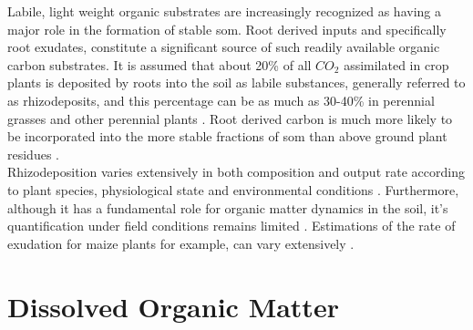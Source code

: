 	Labile, light weight organic substrates are increasingly recognized as having a major role in the formation of stable \gls{som}.
	Root derived inputs and specifically root exudates, constitute a significant source of such readily available organic carbon substrates.  It is assumed that about 20\% of all $ CO_2 $ assimilated in crop plants is deposited by roots into the soil as labile substances, generally referred to as rhizodeposits, and this percentage can be as much as 30-40\% in perennial grasses and other perennial plants \citep{kuzyakov2004, pausch2013, pausch2018}. Root derived carbon is much more likely to be incorporated into the more stable fractions of \gls{som} than above ground plant residues \citep{austin2017, kong2010, puget2001, rasse2005}.\\
	Rhizodeposition varies extensively in both composition and output rate according to plant species, physiological state and environmental conditions \citep{dennis2010, pausch2018, jones2004}. Furthermore, although it has a fundamental role for organic matter dynamics in the soil, it’s quantification under field conditions remains limited \citep{pausch2018}. Estimations of the rate of exudation for maize plants for example, can vary extensively \citep{nguyen2003, pausch2018}.

\section{Dissolved Organic Matter}

